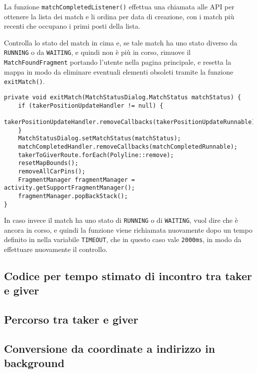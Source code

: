 La funzione \texttt{matchCompletedListener()} effettua una chiamata alle
API per ottenere la lista dei match e li ordina per data di creazione,
con i match più recenti che occupano i primi posti della lista.

Controlla lo stato del match in cima e, se tale match ha uno stato
diverso da \texttt{RUNNING} o da \texttt{WAITING}, e quindi non è più in
corso, rimuove il \texttt{MatchFoundFragment} portando l'utente nella
pagina principale, e resetta la mappa in modo da eliminare eventuali
elementi obsoleti tramite la funzione \texttt{exitMatch()}.

\begin{lstlisting}[caption=Funzione per ripristinare la UI al termine del match]
private void exitMatch(MatchStatusDialog.MatchStatus matchStatus) {
    if (takerPositionUpdateHandler != null) {
        takerPositionUpdateHandler.removeCallbacks(takerPositionUpdateRunnable);
    }
    MatchStatusDialog.setMatchStatus(matchStatus);
    matchCompletedHandler.removeCallbacks(matchCompletedRunnable);
    takerToGiverRoute.forEach(Polyline::remove);
    resetMapBounds();
    removeAllCarPins();
    FragmentManager fragmentManager = activity.getSupportFragmentManager();
    fragmentManager.popBackStack();
}
\end{lstlisting}

In caso invece il match ha uno stato di \texttt{RUNNING} o di
\texttt{WAITING}, vuol dire che è ancora in corso, e quindi la funzione
viene richiamata nuovamente dopo un tempo definito in nella
variabile \texttt{TIMEOUT}, che in questo caso vale \texttt{2000ms}, in
modo da effettuare nuovamente il controllo.

\hypertarget{codice-per-tempo-stimato-di-incontro-tra-taker-e-giver}{%
\subsection{Codice per tempo stimato di incontro tra taker e
giver}\label{codice-per-tempo-stimato-di-incontro-tra-taker-e-giver}}

\hypertarget{percorso-tra-taker-e-giver}{%
\subsection{Percorso tra taker e
giver}\label{percorso-tra-taker-e-giver}}

\hypertarget{conversione-da-coordinate-a-indirizzo-in-background}{%
\subsection{Conversione da coordinate a indirizzo in
background}\label{conversione-da-coordinate-a-indirizzo-in-background}}

